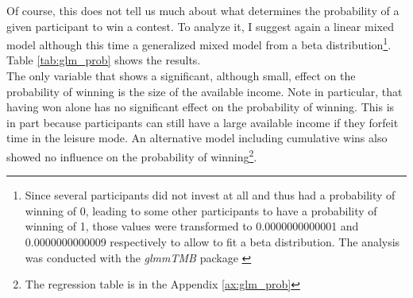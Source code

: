 Of course, this does not tell us much about what determines the probability of a given participant to win a contest. To analyze it, I suggest again a linear mixed model although this time a generalized mixed model from a beta distribution\footnote{Since several participants did not invest at all and thus had a probability of winning of 0, leading to some other participants to have a probability of winning of 1, those values were transformed to 0.0000000000001 and 0.0000000000009 respectively to allow to fit a beta distribution. The analysis was conducted with the \textit{glmmTMB} package \citep{brooks2017}}. Table \ref{tab:glm_prob} shows the results.\\

The only variable that shows a significant, although small, effect on the probability of winning is the size of the available income. Note in particular, that having won alone has no significant effect on the probability of winning. This is in part because participants can still have a large available income if they forfeit time in the leisure mode. An alternative model including cumulative wins also showed no influence on the probability of winning\footnote{The regression table is in the Appendix \ref{ax:glm_prob}}.\\

